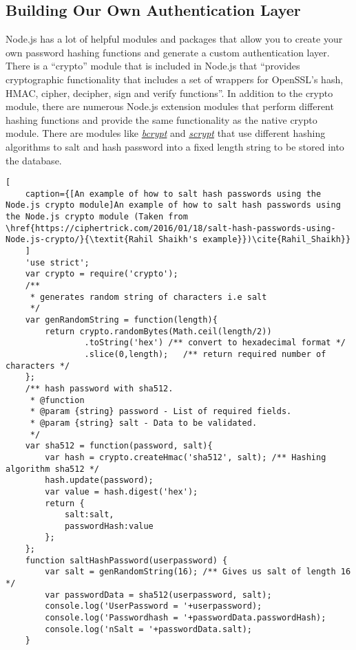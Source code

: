 \documentclass[onecolumn, draftclsnofoot,10pt, compsoc]{IEEEtran}
\begin{document}
\subsection{Building Our Own Authentication Layer}
Node.js has a lot of helpful modules and packages that allow you to create your own password hashing functions and generate a custom authentication layer. There is a ``crypto'' module that is included in Node.js that ``provides cryptographic functionality that includes a set of wrappers for OpenSSL's hash, HMAC, cipher, decipher, sign and verify functions''\cite{Crypto}. In addition to the crypto module, there are numerous Node.js extension modules that perform different hashing functions and provide the same functionality as the native crypto module. There are modules like \href{https://www.npmjs.com/package/bcrypt-Node.js}{\textit{bcrypt}} and \href{https://www.npmjs.com/package/scrypt}{\textit{scrypt}} that use different hashing algorithms to salt and hash password into a fixed length string to be stored into the database.
\begin{lstlisting}[
    caption={[An example of how to salt hash passwords using the Node.js crypto module]An example of how to salt hash passwords using the Node.js crypto module (Taken from \href{https://ciphertrick.com/2016/01/18/salt-hash-passwords-using-Node.js-crypto/}{\textit{Rahil Shaikh's example}})\cite{Rahil_Shaikh}}
    ]
    'use strict';
    var crypto = require('crypto');
    /**
     * generates random string of characters i.e salt
     */
    var genRandomString = function(length){
        return crypto.randomBytes(Math.ceil(length/2))
                .toString('hex') /** convert to hexadecimal format */
                .slice(0,length);   /** return required number of characters */
    };
    /** hash password with sha512.
     * @function
     * @param {string} password - List of required fields.
     * @param {string} salt - Data to be validated.
     */
    var sha512 = function(password, salt){
        var hash = crypto.createHmac('sha512', salt); /** Hashing algorithm sha512 */
        hash.update(password);
        var value = hash.digest('hex');
        return {
            salt:salt,
            passwordHash:value
        };
    };
    function saltHashPassword(userpassword) {
        var salt = genRandomString(16); /** Gives us salt of length 16 */
        var passwordData = sha512(userpassword, salt);
        console.log('UserPassword = '+userpassword);
        console.log('Passwordhash = '+passwordData.passwordHash);
        console.log('nSalt = '+passwordData.salt);
    }
\end{lstlisting}
\end{document}
